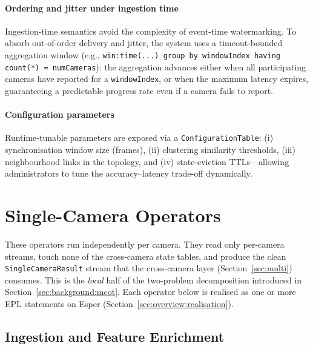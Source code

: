 \documentclass[5p,times]{elsarticle}
\begin{document}
\paragraph{Ordering and jitter under ingestion time}
Ingestion-time semantics avoid the complexity of event-time watermarking. To absorb out-of-order delivery and jitter, the system uses a timeout-bounded aggregation window (e.g., \texttt{win:time(...) group by windowIndex having count(*) = numCameras}): the aggregation advances either when all participating cameras have reported for a \texttt{windowIndex}, or when the maximum latency expires, guaranteeing a predictable progress rate even if a camera fails to report.


\paragraph{Configuration parameters}
Runtime-tunable parameters are exposed via a \texttt{ConfigurationTable}: (i) synchronisation window size (frames), (ii) clustering similarity thresholds, (iii) neighbourhood links in the topology, and (iv) state-eviction TTLs---allowing administrators to tune the accuracy--latency trade-off dynamically.

\section{Single-Camera Operators}
\label{sec:single}

These operators run independently per camera. They read only per-camera streams, touch none of the cross-camera state tables, and produce the clean \texttt{SingleCameraResult} stream that the cross-camera layer (Section~\ref{sec:multi}) consumes. This is the \emph{local} half of the two-problem decomposition introduced in Section~\ref{sec:background:mcot}. Each operator below is realised as one or more EPL statements on Esper (Section~\ref{sec:overview:realisation}).

\subsection{Ingestion and Feature Enrichment}
\label{sec:single:ingestion}
\end{document}
